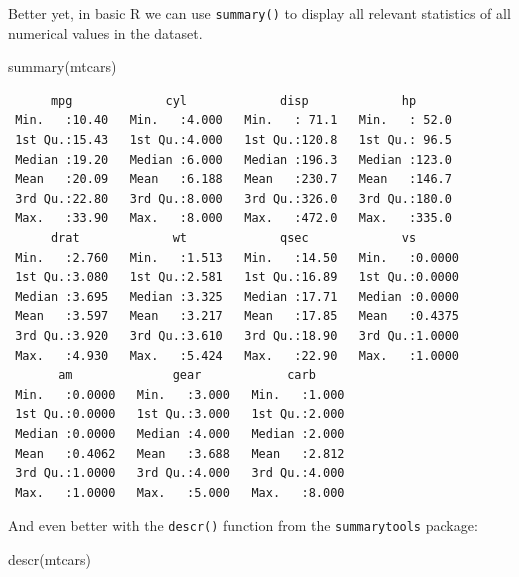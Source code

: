 \documentclass[
  letterpaper,
  DIV=11,
  numbers=noendperiod]{scrartcl}
\newenvironment{Shaded}{\begin{snugshade}}{\end{snugshade}}
\newcommand{\FunctionTok}[1]{\textcolor[rgb]{0.28,0.35,0.67}{#1}}
\newcommand{\NormalTok}[1]{\textcolor[rgb]{0.00,0.23,0.31}{#1}}
\begin{document}
Better yet, in basic R we can use \texttt{summary()} to display all
relevant statistics of all numerical values in the dataset.

\begin{Shaded}
\begin{Highlighting}[]
\FunctionTok{summary}\NormalTok{(mtcars)}
\end{Highlighting}
\end{Shaded}

\begin{verbatim}
      mpg             cyl             disp             hp       
 Min.   :10.40   Min.   :4.000   Min.   : 71.1   Min.   : 52.0  
 1st Qu.:15.43   1st Qu.:4.000   1st Qu.:120.8   1st Qu.: 96.5  
 Median :19.20   Median :6.000   Median :196.3   Median :123.0  
 Mean   :20.09   Mean   :6.188   Mean   :230.7   Mean   :146.7  
 3rd Qu.:22.80   3rd Qu.:8.000   3rd Qu.:326.0   3rd Qu.:180.0  
 Max.   :33.90   Max.   :8.000   Max.   :472.0   Max.   :335.0  
      drat             wt             qsec             vs        
 Min.   :2.760   Min.   :1.513   Min.   :14.50   Min.   :0.0000  
 1st Qu.:3.080   1st Qu.:2.581   1st Qu.:16.89   1st Qu.:0.0000  
 Median :3.695   Median :3.325   Median :17.71   Median :0.0000  
 Mean   :3.597   Mean   :3.217   Mean   :17.85   Mean   :0.4375  
 3rd Qu.:3.920   3rd Qu.:3.610   3rd Qu.:18.90   3rd Qu.:1.0000  
 Max.   :4.930   Max.   :5.424   Max.   :22.90   Max.   :1.0000  
       am              gear            carb      
 Min.   :0.0000   Min.   :3.000   Min.   :1.000  
 1st Qu.:0.0000   1st Qu.:3.000   1st Qu.:2.000  
 Median :0.0000   Median :4.000   Median :2.000  
 Mean   :0.4062   Mean   :3.688   Mean   :2.812  
 3rd Qu.:1.0000   3rd Qu.:4.000   3rd Qu.:4.000  
 Max.   :1.0000   Max.   :5.000   Max.   :8.000  
\end{verbatim}

And even better with the \texttt{descr()} function from the
\texttt{summarytools} package:

\begin{Shaded}
\begin{Highlighting}[]
\FunctionTok{descr}\NormalTok{(mtcars)}
\end{Highlighting}
\end{Shaded}
\end{document}
